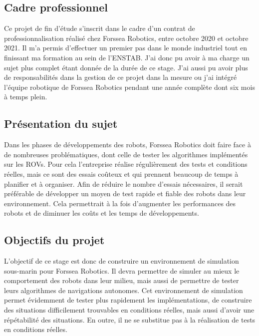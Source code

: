 \subsection{Cadre professionnel}
    Ce projet de fin d'étude s'inscrit dans le cadre d'un contrat de professionnalisation réalisé chez Forssea Robotics, entre octobre 2020 et octobre 2021. Il m'a permis d'effectuer un premier pas dans le monde industriel tout en finissant ma formation au sein de l'\gls{ENSTAB}. J'ai donc pu avoir à ma charge un sujet plus complet étant donnée de la durée de ce stage. J'ai aussi pu avoir plus de responsabilités dans la gestion de ce projet dans la mesure ou j'ai intégré l'équipe robotique de Forssea Robotics pendant une année complète dont six mois à temps plein.

\subsection{Présentation du sujet}
    Dans les phases de développements des robots, Forssea Robotics doit faire face à de nombreuses problématiques, dont celle de tester les algorithmes implémentés sur les \gls{ROV}s. Pour cela l'entreprise réalise régulièrement des tests et conditions réelles, mais ce sont des essais coûteux et qui prennent beaucoup de temps à planifier et à organiser. Afin de réduire le nombre d'essais nécessaires, il serait préférable de développer un moyen de test rapide et fiable des robots dans leur environnement. Cela permettrait à la fois d'augmenter les performances des robots et de diminuer les coûts et les temps de développements.

\subsection{Objectifs du projet}
    L'objectif de ce stage est donc de construire un environnement de simulation sous-marin pour Forssea Robotics. Il devra permettre de simuler au mieux le comportement des robots dans leur milieu, mais aussi de permettre de tester leurs algorithmes de navigations autonomes. Cet environnement de simulation permet évidemment de tester plus rapidement les implémentations, de construire des situations difficilement trouvables en conditions réelles, mais aussi d'avoir une répétabilité des situations. En outre, il ne se substitue pas à la réalisation de tests en conditions réelles.

   